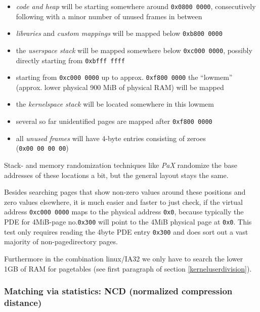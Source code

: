 \begin{itemize}

	\item \emph{code and heap} will be starting somewhere around
	\texttt{0x0800~0000}, consecutively following with a minor number of
	unused frames in between

	\item \emph{libraries} and \emph{custom mappings} will be mapped below
	\texttt{0xb800~0000}

	\item the \emph{userspace stack} will be mapped somewhere below
	\texttt{0xc000~0000}, possibly directly starting from
	\texttt{0xbfff~ffff}

	\item starting from \texttt{0xc000~0000} up to approx.
	\texttt{0xf800~0000} the ``lowmem'' (approx. lower physical 900 MiB of
	physical RAM) will be mapped

	\item the \emph{kernelspace stack} will be located somewhere in this
	lowmem

	\item several so far unidentified pages are mapped after
	\texttt{0xf800~0000}

	\item all \emph{unused frames} will have 4-byte entries consisting of
	zeroes (\texttt{0x00~00~00~00})

\end{itemize}

Stack- and memory randomization techniques like \emph{PaX} randomize the base
addresses of these locations a bit, but the general layout stays the same.

Besides searching pages that show non-zero values around these positions and
zero values elsewhere, it is much easier and faster to just check, if the
virtual address \texttt{0xc000~0000} maps to the physical address \texttt{0x0},
because typically the PDE for 4MiB-page no.\@ \texttt{0x300} will point to the
4MiB physical page at \texttt{0x0}. This test only requires reading the 4byte
PDE entry \texttt{0x300} and does sort out a vast majority of non-pagedirectory
pages.

Furthermore in the combination linux/IA32 we only have to search the lower 1GB
of RAM for pagetables (see first paragraph of section \ref{kerneluserdivision}).



\subsubsection{Matching via statistics: NCD (normalized compression distance)}

